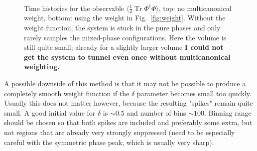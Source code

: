 \documentclass[11pt,a4paper]{article}
\newcommand\Tr{\operatorname{Tr}}
\begin{document}
\begin{figure}[H]
	\centering
	 \\
	\vspace{-0.25cm}
	\caption{Time histories for the observable $\langle\frac12 \Tr\Phi^\dagger\Phi\rangle$, top: no multicanonical weight, bottom: using the weight in Fig.~\ref{fig:weight}. Without the weight function, the system is stuck in the pure phases and only rarely samples the mixed-phase configurations. Here the volume is still quite small; already for a slightly larger volume \textbf{I could not get the system to tunnel even once without multicanonical weighting.}} 
\end{figure}


A possible downside of this method is that it may not be possible to produce a completely smooth weight function if the $\delta$ parameter becomes small too quickly. Usually this does not matter however, because the resulting "spikes" remain quite small. A good initial value for $\delta$ is $\sim 0.5$ and number of bins $\sim 100$. Binning range should be chosen so that both spikes are included and preferably some extra, but not regions that are already very strongly suppressed (need to be especially careful with the symmetric phase peak, which is usually very sharp).
\end{document}
